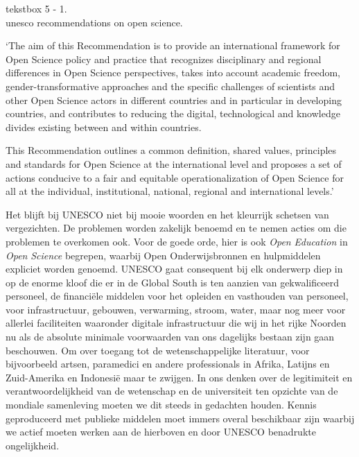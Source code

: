 \documentclass[smallauthor, chapterhaspagenum, nochapterinheader, pagenuminheader,  bigchapnum,medium2, tocpages, garamond, titleinheader]{jote-book}
\begin{document}
	\begin{bookbox}{\raggedright tekstbox 5 - 1. \\unesco{} recommendations on open science.}
		‘The aim of this Recommendation is to provide an international framework for Open Science policy and practice that recognizes disciplinary and regional differences in Open Science perspectives, takes into account academic freedom, gender-transformative approaches and the specific challenges of scientists and other Open Science actors in different countries and in particular in developing countries, and contributes to reducing the digital, technological and knowledge divides existing between and within countries.

		\vspace*{\baselineskip}

		This Recommendation outlines a common definition, shared values, principles and standards for Open Science at the international level and proposes a set of actions conducive to a fair and equitable operationalization of Open Science for all at the individual, institutional, national, regional and international levels.'
	\end{bookbox}

	Het blijft bij UNESCO niet bij mooie woorden en het kleurrijk schetsen van vergezichten. De problemen worden zakelijk benoemd en te nemen acties om die problemen te overkomen ook. Voor de goede orde, hier is ook \emph{Open }\emph{Education} in \emph{Open }\emph{Science} begrepen, waarbij Open Onderwijsbronnen en hulpmiddelen expliciet worden genoemd. UNESCO gaat consequent bij elk onderwerp diep in op de enorme kloof die er in de Global South is ten aanzien van gekwalificeerd personeel, de financiële middelen voor het opleiden en vasthouden van personeel, voor infrastructuur, gebouwen, verwarming, stroom, water, maar nog meer voor allerlei faciliteiten waaronder digitale infrastructuur die wij in het rijke Noorden nu als de absolute minimale voorwaarden van ons dagelijks bestaan zijn gaan beschouwen. Om over toegang tot de wetenschappelijke literatuur, voor bijvoorbeeld artsen, paramedici en andere professionals in Afrika, Latijns en Zuid-Amerika en Indonesië maar te zwijgen. In ons denken over de legitimiteit en verantwoordelijkheid van de wetenschap en de universiteit ten opzichte van de mondiale samenleving moeten we dit steeds in gedachten houden. Kennis geproduceerd met publieke middelen moet immers overal beschikbaar zijn waarbij we actief moeten werken aan de hierboven en door UNESCO benadrukte ongelijkheid.
\end{document}
